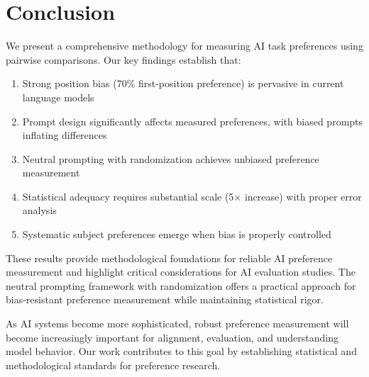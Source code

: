 \documentclass[11pt,a4paper]{article}
\begin{document}
\section{Conclusion}

We present a comprehensive methodology for measuring AI task preferences using pairwise comparisons. Our key findings establish that:

\begin{enumerate}
    \item Strong position bias (70\% first-position preference) is pervasive in current language models
    \item Prompt design significantly affects measured preferences, with biased prompts inflating differences
    \item Neutral prompting with randomization achieves unbiased preference measurement
    \item Statistical adequacy requires substantial scale (5× increase) with proper error analysis
    \item Systematic subject preferences emerge when bias is properly controlled
\end{enumerate}

These results provide methodological foundations for reliable AI preference measurement and highlight critical considerations for AI evaluation studies. The neutral prompting framework with randomization offers a practical approach for bias-resistant preference measurement while maintaining statistical rigor.

As AI systems become more sophisticated, robust preference measurement will become increasingly important for alignment, evaluation, and understanding model behavior. Our work contributes to this goal by establishing statistical and methodological standards for preference research.



\end{document}
